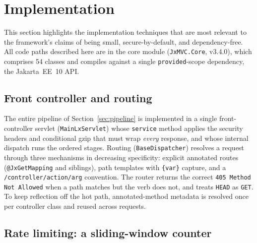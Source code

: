\section{Implementation}\label{sec:impl}

This section highlights the implementation techniques that are most
relevant to the framework's claims of being small, secure-by-default,
and dependency-free. All code paths described here are in the core
module (\texttt{JxMVC.Core}, v3.4.0), which comprises 54 classes and
compiles against a single \texttt{provided}-scope dependency, the
Jakarta~EE~10 API.

\subsection{Front controller and routing}

The entire pipeline of Section~\ref{sec:pipeline} is implemented in a
single front-controller servlet (\texttt{MainLxServlet}) whose
\texttt{service} method applies the security headers and conditional
gzip that must wrap \emph{every} response, and whose internal dispatch
runs the ordered stages. Routing (\texttt{BaseDispatcher}) resolves a
request through three mechanisms in decreasing specificity: explicit
annotated routes (\texttt{@JxGetMapping} and siblings), path templates
with \texttt{\{var\}} capture, and a
\texttt{/controller/action/arg} convention. The router returns the
correct \texttt{405 Method Not Allowed} when a path matches but the
verb does not, and treats \texttt{HEAD} as \texttt{GET}. To keep
reflection off the hot path, annotated-method metadata is resolved once
per controller class and reused across requests.

\subsection{Rate limiting: a sliding-window counter}

